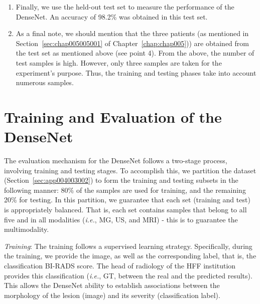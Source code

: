 \begin{enumerate}
\vspace{0.50mm}

\item Finally, we use the held-out test set to measure the performance of the DenseNet.
An accuracy of 98.2\% was obtained in this test set.

\vspace{0.50mm}

\item As a final note, we should mention that the three patients (as mentioned in Section~\ref{sec:chap005005001} of Chapter~\ref{chap:chap005})) are obtained from the test set as mentioned above (see point 4).
From the above, the number of test samples is high.
However, only three samples are taken  for the experiment's purpose.
Thus, the training and testing phases take into account numerous samples.

\end{enumerate}

\section{Training and Evaluation of the DenseNet}
\label{sec:app004004}

The evaluation mechanism for the DenseNet follows a two-stage process, involving training and testing stages.
To accomplish this, we partition the dataset (Section~\ref{sec:app004003002}) to form the training and testing subsets in the following manner:
80\% of the samples are used for training, and the remaining 20\% for testing.
In this partition, we guarantee that each set (training and test) is appropriately balanced.
That is, each set contains samples that belong to all five and in all modalities ({\it i.e.}, \ac{MG}, \ac{US}, and \ac{MRI}) - this is to guarantee  the multimodality.

\vspace{1mm}

\noindent
{\it Training}:
The training follows a supervised learning strategy.
Specifically, during the training, we provide the image, as well as the corresponding label, that is, the classification \ac{BI-RADS} score.
The head of radiology of the \ac{HFF} institution provides this classification ({\it i.e.}, \ac{GT}, between the real and the predicted results).
This allows the DenseNet ability to establish associations between the morphology of the lesion (image) and its severity (classification label).

\vspace{1mm}

